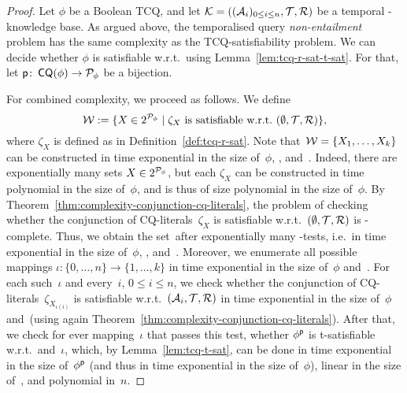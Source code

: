 \begin{proof}
    Let $\phi$ be a Boolean TCQ, and let
    $\mathcal{K}=((\mathcal{A}_i)_{0\le i\le n},\mathcal{T},\mathcal{R})$ be a temporal \SHQ-knowledge base.
    As argued above, the temporalised query \emph{non-entailment} problem has
    the same complexity as the TCQ-satisfiability problem.
    We can decide whether $\phi$ is satisfiable w.r.t.~\Kmc using
    Lemma~\ref{lem:tcq-r-sat-t-sat}.  For that, let
    $\mathsf{p}\colon\operatorname{\mathsf{CQ}}(\phi)\to\mathcal{P}_\phi$ be a bijection.

    For combined complexity, we proceed as follows.  We define
    \[\Wmc:=\{X\in 2^{\Pmc_\phi}\mid%
        \text{$\zeta_X$ is satisfiable w.r.t.~$(\emptyset,\Tmc,\Rmc)$}\},\]
    where $\zeta_X$ is defined as in Definition~\ref{def:tcq-r-sat}.
    Note that~$\mathcal{W}=\{X_1,\dots,X_k\}$ can be constructed in time exponential in
    the size of~$\phi$, \Tmc, and~\Rmc.  Indeed, there are exponentially many
    sets $X\in 2^{\mathcal{P}_\phi}$, but each $\zeta_X$ can be constructed in time
    polynomial in the size of~$\phi$, and is thus of size polynomial in the size
    of~$\phi$.  By Theorem~\ref{thm:complexity-conjunction-cq-literals}, the
    problem of checking whether the conjunction of CQ-literals~$\zeta_X$ is
    satisfiable w.r.t.~$(\emptyset,\mathcal{T},\mathcal{R})$ is \ExpTime-complete.  Thus, we
    obtain the set~\Wmc after exponentially many \ExpTime-tests, i.e.~in time
    exponential in the size of~$\phi$, \Tmc, and~\Rmc.
    Moreover, we enumerate all possible mappings
    $\iota\colon\{0,\dots,n\}\to\{1,\dots,k\}$ in time exponential in the size
    of~$\phi$ and~\Kmc.  For each such~$\iota$ and every~$i$, $0\le i\le n$, we
    check whether the conjunction of CQ-literals~$\zeta_{X_{\iota(i)}}$ is
    satisfiable w.r.t.~$(\mathcal{A}_i,\mathcal{T},\mathcal{R})$ in time exponential in the size
    of~$\phi$ and~\Kmc (using again
    Theorem~\ref{thm:complexity-conjunction-cq-literals}).
    After that, we check for ever mapping~$\iota$ that passes this test, whether
    $\phi^\mathsf{p}$ is t-satisfiable w.r.t.~\Wmc and~$\iota$, which, by
    Lemma~\ref{lem:tcq-t-sat}, can be done in time exponential in the size
    of~$\phi^\mathsf{p}$ (and thus in time exponential in the size of~$\phi$), linear
    in the size of~\Wmc, and polynomial in~$n$.


\end{proof}
